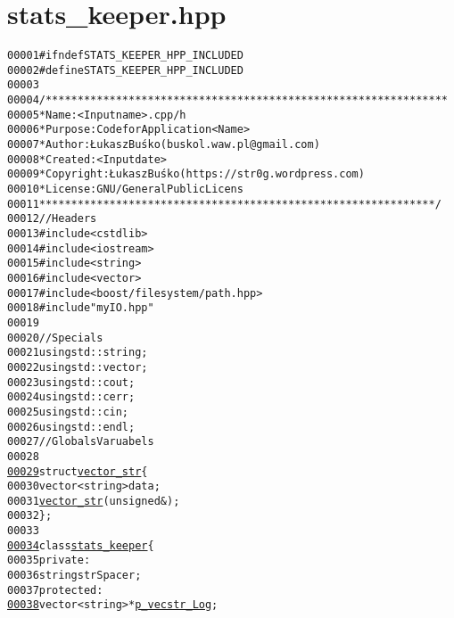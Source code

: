 \hypertarget{stats__keeper_8hpp_source}{
\section{stats\_\-keeper.hpp}
}


\begin{footnotesize}\begin{alltt}
00001 \textcolor{preprocessor}{#ifndef STATS\_KEEPER\_HPP\_INCLUDED}
00002 \textcolor{preprocessor}{}\textcolor{preprocessor}{#define STATS\_KEEPER\_HPP\_INCLUDED}
00003 \textcolor{preprocessor}{}
00004 \textcolor{comment}{/***************************************************************}
00005 \textcolor{comment}{ * Name:      <Input name>.cpp/h}
00006 \textcolor{comment}{ * Purpose:   Code for Application <Name>}
00007 \textcolor{comment}{ * Author:    Łukasz Buśko (buskol.waw.pl@gmail.com)}
00008 \textcolor{comment}{ * Created:   <Input date>}
00009 \textcolor{comment}{ * Copyright: Łukasz Buśko (https://str0g.wordpress.com)}
00010 \textcolor{comment}{ * License:   GNU / General Public Licens}
00011 \textcolor{comment}{ **************************************************************/}
00012 \textcolor{comment}{//Headers}
00013 \textcolor{preprocessor}{#include <cstdlib>}
00014 \textcolor{preprocessor}{#include <iostream>}
00015 \textcolor{preprocessor}{#include <string>}
00016 \textcolor{preprocessor}{#include <vector>}
00017 \textcolor{preprocessor}{#include <boost/filesystem/path.hpp>}
00018 \textcolor{preprocessor}{#include "myIO.hpp"}
00019 
00020 \textcolor{comment}{//Specials}
00021 \textcolor{keyword}{using} std::string;
00022 \textcolor{keyword}{using} std::vector;
00023 \textcolor{keyword}{using} std::cout;
00024 \textcolor{keyword}{using} std::cerr;
00025 \textcolor{keyword}{using} std::cin;
00026 \textcolor{keyword}{using} std::endl;
00027 \textcolor{comment}{//Globals Varuabels}
00028 
\hypertarget{stats__keeper_8hpp_source_l00029}{}\hyperlink{structvector__str}{00029} \textcolor{keyword}{struct }\hyperlink{structvector__str}{vector_str}\{
00030     vector<string> data;
00031     \hyperlink{structvector__str}{vector_str}(\textcolor{keywordtype}{unsigned} &);
00032 \};
00033 
\hypertarget{stats__keeper_8hpp_source_l00034}{}\hyperlink{classstats__keeper}{00034} \textcolor{keyword}{class }\hyperlink{classstats__keeper}{stats_keeper}\{
00035     \textcolor{keyword}{private}:
00036         \textcolor{keywordtype}{string} strSpacer; 
00037     \textcolor{keyword}{protected}:
\hypertarget{stats__keeper_8hpp_source_l00038}{}\hyperlink{classstats__keeper_a63b7a9f360e0a77d64236c59427c5a70}{00038}         vector<string> *\hyperlink{classstats__keeper_a63b7a9f360e0a77d64236c59427c5a70}{p_vecstr_Log}; 

\end{alltt}
\end{footnotesize}
